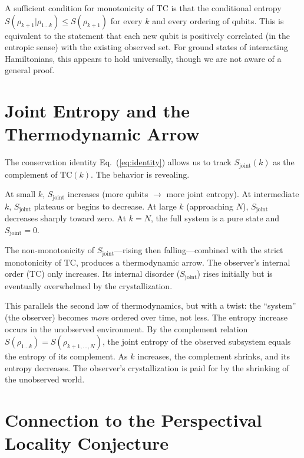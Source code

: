 \documentclass[aps,pra,twocolumn,superscriptaddress,floatfix]{revtex4-2}
\begin{document}
A sufficient condition for monotonicity of $\mathrm{TC}$ is that the conditional entropy $S(\rho_{k+1} | \rho_{1\ldots k}) \leq S(\rho_{k+1})$ for every $k$ and every ordering of qubits.
This is equivalent to the statement that each new qubit is positively correlated (in the entropic sense) with the existing observed set.
For ground states of interacting Hamiltonians, this appears to hold universally, though we are not aware of a general proof.


\section{Joint Entropy and the Thermodynamic Arrow}
\label{sec:arrow}

The conservation identity Eq.~(\ref{eq:identity}) allows us to track $S_{\mathrm{joint}}(k)$ as the complement of $\mathrm{TC}(k)$.
The behavior is revealing.

At small $k$, $S_{\mathrm{joint}}$ increases (more qubits $\to$ more joint entropy).
At intermediate $k$, $S_{\mathrm{joint}}$ plateaus or begins to decrease.
At large $k$ (approaching $N$), $S_{\mathrm{joint}}$ decreases sharply toward zero.
At $k = N$, the full system is a pure state and $S_{\mathrm{joint}} = 0$.

The non-monotonicity of $S_{\mathrm{joint}}$---rising then falling---combined with the strict monotonicity of $\mathrm{TC}$, produces a thermodynamic arrow.
The observer's internal order ($\mathrm{TC}$) only increases.
Its internal disorder ($S_{\mathrm{joint}}$) rises initially but is eventually overwhelmed by the crystallization.

This parallels the second law of thermodynamics, but with a twist: the ``system'' (the observer) becomes \emph{more} ordered over time, not less.
The entropy increase occurs in the unobserved environment.
By the complement relation $S(\rho_{1\ldots k}) = S(\rho_{k+1,\ldots,N})$, the joint entropy of the observed subsystem equals the entropy of its complement.
As $k$ increases, the complement shrinks, and its entropy decreases.
The observer's crystallization is paid for by the shrinking of the unobserved world.


\section{Connection to the Perspectival Locality Conjecture}
\label{sec:plc}
\end{document}
